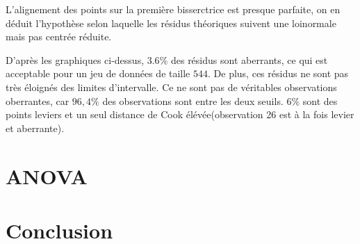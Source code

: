 \documentclass[12pt, twocolumn]{article}
\begin{document}
L'alignement des points sur la première bisserctrice est presque parfaite, on en déduit l'hypothèse selon laquelle les résidus théoriques suivent une loinormale mais pas centrée réduite.


D'après les graphiques ci-dessus, $3.6\%$ des résidus sont aberrants, ce qui est acceptable pour un jeu de données de taille $544$.
De plus, ces résidus ne sont pas très éloignés des limites d'intervalle. Ce ne sont pas de véritables observations oberrantes, car $96,4\%$ des
observations sont entre les deux seuils. $6\%$ sont des points leviers et un seul distance de Cook élévée(observation 26 est à la fois levier et aberrante).



\section{ANOVA} 


\section{Conclusion} 


  


%
\end{document}
